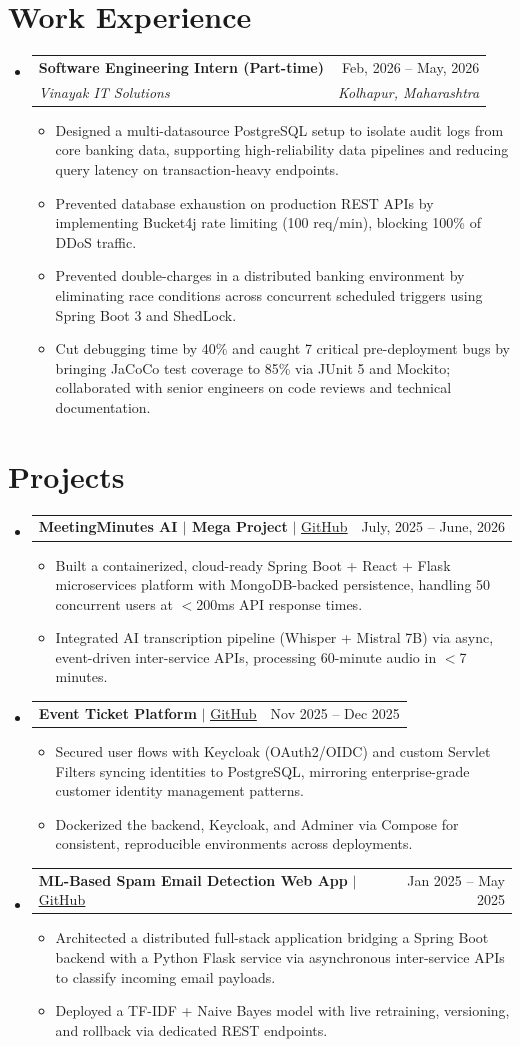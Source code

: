 \documentclass[letterpaper,11pt]{article}
\makeatletter
\newcommand{\resumeItem}[1]{
  \item\small{
    {#1 \vspace{-2pt}}
  }
}
\newcommand{\resumeSubheading}[4]{
  \vspace{-2pt}\item
    \begin{tabular*}{0.97\textwidth}[t]{l@{\extracolsep{\fill}}r}
      \textbf{#1} & #2 \\
      \textit{\small#3} & \textit{\small #4} \\
    \end{tabular*}\vspace{-7pt}
}
\newcommand{\resumeProjectHeading}[2]{
    \item
    \begin{tabular*}{0.97\textwidth}{l@{\extracolsep{\fill}}r}
      \small#1 & #2 \\
    \end{tabular*}\vspace{-7pt}
}
\newcommand{\resumeSubHeadingListStart}{\begin{itemize}[leftmargin=0.15in, label={}]}
\newcommand{\resumeSubHeadingListEnd}{\end{itemize}}
\newcommand{\resumeItemListStart}{\begin{itemize}}
\newcommand{\resumeItemListEnd}{\end{itemize}\vspace{-5pt}}
\makeatother
\begin{document}
\section{Work Experience}
  \resumeSubHeadingListStart
    \resumeSubheading
      {Software Engineering Intern (Part-time)}{Feb, 2026 -- May, 2026}
      {Vinayak IT Solutions}{Kolhapur, Maharashtra}
      \resumeItemListStart
        \resumeItem{Designed a multi-datasource PostgreSQL setup to isolate audit logs from core banking data, supporting high-reliability data pipelines and reducing query latency on transaction-heavy endpoints.}
        \resumeItem{Prevented database exhaustion on production REST APIs by implementing Bucket4j rate limiting (100 req/min), blocking 100\% of DDoS traffic.}
        \resumeItem{Prevented double-charges in a distributed banking environment by eliminating race conditions across concurrent scheduled triggers using Spring Boot 3 and ShedLock.}
        \resumeItem{Cut debugging time by 40\% and caught 7 critical pre-deployment bugs by bringing JaCoCo test coverage to 85\% via JUnit 5 and Mockito; collaborated with senior engineers on code reviews and technical documentation.}
      \resumeItemListEnd
  \resumeSubHeadingListEnd
\section{Projects}
    \resumeSubHeadingListStart
      \resumeProjectHeading
          {\textbf{MeetingMinutes AI $|$ Mega Project} $|$ \href{https://github.com/ommagdum/academic-meeting-minutes}{\underline{GitHub}}}{July, 2025 -- June, 2026}
          \resumeItemListStart
            \resumeItem{Built a containerized, cloud-ready Spring Boot + React + Flask microservices platform with MongoDB-backed persistence, handling 50 concurrent users at $<$200ms API response times.}
            \resumeItem{Integrated AI transcription pipeline (Whisper + Mistral 7B) via async, event-driven inter-service APIs, processing 60-minute audio in $<$7 minutes.}
          \resumeItemListEnd
          
      \resumeProjectHeading
          {\textbf{Event Ticket Platform} $|$ \href{https://github.com/ommagdum/tickets}{\underline{GitHub}}}{Nov 2025 -- Dec 2025}
          \resumeItemListStart
            \resumeItem{Secured user flows with Keycloak (OAuth2/OIDC) and custom Servlet Filters syncing identities to PostgreSQL, mirroring enterprise-grade customer identity management patterns.}
            \resumeItem{Dockerized the backend, Keycloak, and Adminer via Compose for consistent, reproducible environments across deployments.}
          \resumeItemListEnd
      \resumeProjectHeading
          {\textbf{ML-Based Spam Email Detection Web App} $|$ \href{https://github.com/ommagdum/intelligent-spam-detection}{\underline{GitHub}}}{Jan 2025 -- May 2025}
          \resumeItemListStart
            \resumeItem{Architected a distributed full-stack application bridging a Spring Boot backend with a Python Flask service via asynchronous inter-service APIs to classify incoming email payloads.}
            \resumeItem{Deployed a TF-IDF + Naive Bayes model with live retraining, versioning, and rollback via dedicated REST endpoints.}
          \resumeItemListEnd
    \resumeSubHeadingListEnd
\end{document}
